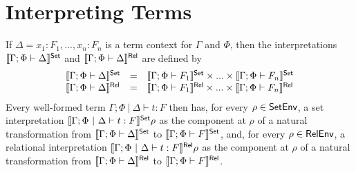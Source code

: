 \documentclass{lmcs}
\theoremstyle{plain}\newtheorem{satz}[thm]{Satz}
\renewcommand{\id}{\mathit{id}}
\begin{document}
{\begin{comment}
Expanding Equation~\ref{eq:graph-two} gives that, for any
$x \in \setsem{\Gamma; \Phi \vdash F}\rho$,
then
\[
(\setsem{\Gamma; \Phi \vdash F}\id_{\rho}\, x, \setsem{\Gamma; \Phi
  \vdash F} f\, x) \in \relsem{\Gamma; \Phi \vdash F}\graph{f} 
\]
Observe that $\setsem{\Gamma; \Phi \vdash F}\id_{\rho}\, x =
\id_{\setsem{\Gamma; \Phi \vdash F}\rho} x = x$ so, for any $x \in
\setsem{\Gamma; \Phi \vdash F}\rho$, we have that $(x, \setsem{\Gamma;
  \Phi \vdash F}f\, x) \in \relsem{\Gamma; \Phi \vdash F}\graph{f}$.
Moreover, $x \in \setsem{\Gamma; \Phi \vdash F}\rho$ if and only if
$(x, \setsem{\Gamma; \Phi \vdash F} f\, x) \in \graph{\setsem{\Gamma;
    \Phi \vdash F}f}$ and, if $x \in \setsem{\Gamma; \Phi \vdash
  F}\rho$ then $(x, \setsem{\Gamma; \Phi \vdash F} f\, x) \in
\relsem{\Gamma; \Phi \vdash F} \graph{f}$, so if $(x, \setsem{\Gamma;
  \Phi \vdash F} f\, x) \in \graph{\setsem{\Gamma; \Phi \vdash F}f}$
then $(x, \setsem{\Gamma; \Phi \vdash F} f\, x) \in \relsem{\Gamma;
  \Phi \vdash F} \graph{f}$, i.e., $\graph{\setsem{\Gamma; \Phi \vdash
    F}f} \subseteq \relsem{\Gamma; \Phi \vdash F} \graph{f}$. We
conclude that $\relsem{\Gamma; \Phi \vdash F}\graph{f} =
\graph{\setsem{\Gamma; \Phi \vdash F}f}$ as desired.
\end{proof}
\end{comment}

\section{Interpreting Terms}\label{sec:term-interp}

If $\Delta = x_1 : F_1,...,x_n : F_n$ is a term context for $\Gamma$
and $\Phi$, then the interpretations $\llbracket{\Gamma;\Phi \vdash
  \Delta}\rrbracket^{\mathsf{Set}}$ and $\llbracket{\Gamma;\Phi \vdash \Delta}\rrbracket^{\mathsf{Rel}}$ are defined by
\[\begin{array}{lll}
\llbracket{\Gamma;\Phi \vdash \Delta}\rrbracket^{\mathsf{Set}} & = & \llbracket{\Gamma;\Phi \vdash
  F_1}\rrbracket^{\mathsf{Set}} \times ... \times \llbracket{\Gamma;\Phi \vdash F_n}\rrbracket^{\mathsf{Set}}\\ 
\llbracket{\Gamma;\Phi \vdash \Delta}\rrbracket^{\mathsf{Rel}} & = & \llbracket{\Gamma;\Phi \vdash
  F_1}\rrbracket^{\mathsf{Rel}} \times ... \times \llbracket{\Gamma;\Phi \vdash F_n}\rrbracket^{\mathsf{Rel}}\\ 
\end{array}\]
Every well-formed term $\Gamma;\Phi~|~\Delta \vdash t : F$ then has,
for every $\rho \in \mathsf{SetEnv}$, a set interpretation
$\llbracket{\Gamma;\Phi~|~\Delta \vdash t : F}\rrbracket^{\mathsf{Set}}\rho$ as the component at
$\rho$ of a natural transformation from $\llbracket{\Gamma; \Phi \vdash
  \Delta}\rrbracket^{\mathsf{Set}}$ to $\llbracket{\Gamma; \Phi \vdash F}\rrbracket^{\mathsf{Set}}$, and, for every $\rho
\in \mathsf{RelEnv}$, a relational interpretation
$\llbracket{\Gamma;\Phi~|~\Delta \vdash t : F}\rrbracket^{\mathsf{Rel}}\rho$ as the component at
$\rho$ of a natural transformation from $\llbracket{\Gamma; \Phi \vdash
  \Delta}\rrbracket^{\mathsf{Rel}}$ to $\llbracket{\Gamma; \Phi \vdash F}\rrbracket^{\mathsf{Rel}}$.

}
\end{document}
